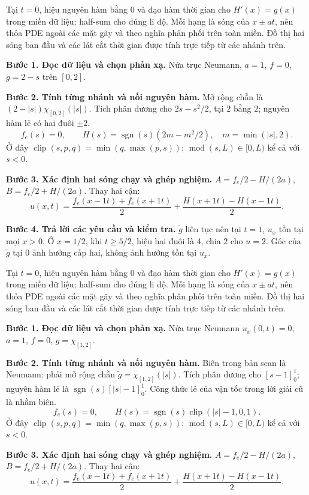 Tại $t=0$, hiệu nguyên hàm bằng $0$ và đạo hàm thời gian cho $H'(x)=g(x)$ trong miền dữ liệu; half-sum cho đúng li độ. Mỗi hạng là sóng của $x\pm at$, nên thỏa PDE ngoài các mặt gãy và theo nghĩa phân phối trên toàn miền. Đồ thị hai sóng ban đầu và các lát cắt thời gian được tính trực tiếp từ các nhánh trên.

\textbf{Bước 1. Đọc dữ liệu và chọn phản xạ.} Nửa trục Neumann, $a=1$, $f=0$, $g=2-s$ trên $[0,2]$.

\textbf{Bước 2. Tính từng nhánh và nối nguyên hàm.} Mở rộng chẵn là $(2-|s|)\chi_{[0,2]}(|s|)$. Tích phân dương cho $2s-s^2/2$, tại $2$ bằng $2$; nguyên hàm lẻ có hai đuôi $\pm2$.
\[f_e(s)=0,\qquad H(s)=\operatorname{sgn}(s)(2m-m^2/2),\quad m=\min(|s|,2).\]
Ở đây $\operatorname{clip}(s,p,q)=\min(q,\max(p,s))$; $\operatorname{mod}(s,L)\in[0,L)$ kể cả với $s<0$.

\textbf{Bước 3. Xác định hai sóng chạy và ghép nghiệm.} $A=f_e/2-H/(2a)$, $B=f_e/2+H/(2a)$. Thay hai cận:
\[u(x,t)=\frac{f_e(x-1t)+f_e(x+1t)}2+\frac{H(x+1t)-H(x-1t)}{2}.\]

\textbf{Bước 4. Trả lời các yêu cầu và kiểm tra.} $\widetilde g$ liên tục nên tại $t=1$, $u_x$ tồn tại mọi $x>0$. Ở $x=1/2$, khi $t\ge5/2$, hiệu hai đuôi là $4$, chia $2$ cho $u=2$. Góc của $\widetilde g$ tại $0$ ảnh hưởng cấp hai, không ảnh hưởng tồn tại $u_x$.

Tại $t=0$, hiệu nguyên hàm bằng $0$ và đạo hàm thời gian cho $H'(x)=g(x)$ trong miền dữ liệu; half-sum cho đúng li độ. Mỗi hạng là sóng của $x\pm at$, nên thỏa PDE ngoài các mặt gãy và theo nghĩa phân phối trên toàn miền. Đồ thị hai sóng ban đầu và các lát cắt thời gian được tính trực tiếp từ các nhánh trên.

\textbf{Bước 1. Đọc dữ liệu và chọn phản xạ.} Nửa trục Neumann $u_x(0,t)=0$, $a=1$, $f=0$, $g=\chi_{[1,2]}$.

\textbf{Bước 2. Tính từng nhánh và nối nguyên hàm.} Biên trong bản scan là Neumann: phải mở rộng chẵn $\widetilde g=\chi_{[1,2]}(|s|)$. Tích phân dương cho $[s-1]_0^1$; nguyên hàm lẻ là $\operatorname{sgn}(s)[|s|-1]_0^1$. Công thức lẻ của vận tốc trong lời giải cũ là nhầm biên.
\[f_e(s)=0,\qquad H(s)=\operatorname{sgn}(s)\operatorname{clip}(|s|-1,0,1).\]
Ở đây $\operatorname{clip}(s,p,q)=\min(q,\max(p,s))$; $\operatorname{mod}(s,L)\in[0,L)$ kể cả với $s<0$.

\textbf{Bước 3. Xác định hai sóng chạy và ghép nghiệm.} $A=f_e/2-H/(2a)$, $B=f_e/2+H/(2a)$. Thay hai cận:
\[u(x,t)=\frac{f_e(x-1t)+f_e(x+1t)}2+\frac{H(x+1t)-H(x-1t)}{2}.\]

